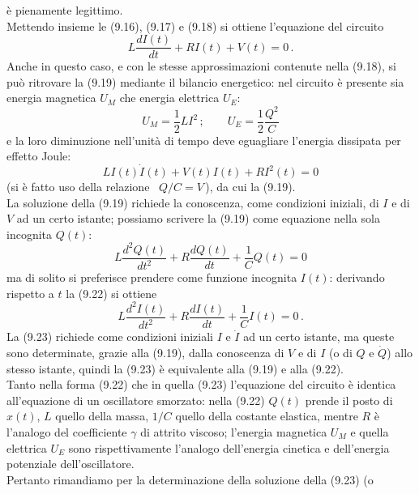 \`e pienamente legittimo.\\
Mettendo insieme le (9.16), (9.17) e (9.18) si ottiene l'equazione del circuito
\begin{equation}
  L\frac{dI(t)}{dt}+RI(t)+V(t)=0\,.
  \tag{9.19}
\end{equation}
Anche in questo caso, e con le stesse approssimazioni contenute nella (9.18), si
pu\`o ritrovare la (9.19) mediante il bilancio energetico: nel circuito \`e
presente sia energia magnetica $U_M$ che energia elettrica $U_E$:
\begin{equation}
  U_M=\frac{1}{2}LI^2\,;\qquad U_E=\frac{1}{2}\frac{Q^2}{C}
  \tag{9.20}
\end{equation}
e la loro diminuzione nell'unit\`a di tempo deve eguagliare l'energia dissipata
per effetto Joule:
\begin{equation}
  LI(t)\dot I(t)+V(t)I(t)+RI^2(t)=0
  \tag{9.21}
\end{equation}
(si \`e fatto uso della relazione \ $Q/C=V$\,), da cui la (9.19).\\
La soluzione della (9.19) richiede la conoscenza, come condizioni iniziali, di
$I$ e di $V$ ad un certo istante; possiamo scrivere la (9.19) come equazione
nella sola incognita $Q(t)$:
\begin{equation}
  L\frac{d^2Q(t)}{dt^2}+R\frac{dQ(t)}{dt}+\frac{1}{C}Q(t)=0
  \tag{9.22}
\end{equation}
ma di solito si preferisce prendere come funzione incognita $I(t)$: derivando
rispetto a $t$ la (9.22) si ottiene
\begin{equation}
  L\frac{d^2I(t)}{dt^2}+R\frac{dI(t)}{dt}+\frac{1}{C}I(t)=0\,.
  \tag{9.23}
\end{equation}
La (9.23) richiede come condizioni iniziali $I$ e $\dot I$ ad un certo istante,
ma queste sono determinate, grazie alla (9.19), dalla conoscenza di $V$ e di $I$
(o di $Q$ e $\dot Q$) allo stesso istante, quindi la (9.23) \`e equivalente alla
(9.19) e alla (9.22).\\
Tanto nella forma (9.22) che in quella (9.23) l'equazione del circuito \`e
identica all'equazione di un oscillatore smorzato: nella (9.22) $Q(t)$ prende il
posto di $x(t)$, $L$ quello della massa, $1/C$ quello della costante elastica,
mentre $R$ \`e l'analogo del coefficiente $\gamma$ di attrito viscoso; l'energia
magnetica $U_M$ e quella elettrica $U_E$ sono rispettivamente l'analogo
dell'energia cinetica e dell'energia potenziale dell'oscillatore.\\
Pertanto rimandiamo per la determinazione della soluzione della (9.23) \big(o
